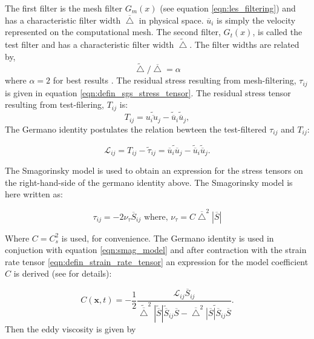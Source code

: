 The first filter is the mesh filter $G_m(x)$ (see equation \eqref{eqn:les_filtering}) and has a
characteristic filter width $\overline \bigtriangleup$ in physical space. $\overline{u}_i$ is simply
the velocity represented on the computational mesh. The second filter, $G_t(x)$, is called the test filter
and has a characteristic filter width $\widetilde \bigtriangleup$.
The filter widths are related by,
\begin{equation}
\widetilde \bigtriangleup/\overline \bigtriangleup = \alpha
\label{eqn:les_filter_ratio}
\end{equation}
where $\alpha=2$ for best results \citep{germano1991}. The residual stress resulting from mesh-filtering,
$\tau_{ij}$ is given in equation \eqref{eqn:defin_sgs_stress_tensor}. The residual stress tensor resulting
from test-filering, $T_{ij}$ is:
\begin{equation}\label{testtau}
T_{ij} = \widetilde{\overline{u_i u_j}} - \widetilde{\overline u}_i \widetilde{\overline u}_j,
\end{equation}
The Germano identity postulates the relation bewteen the test-filtered $\tau_{ij}$ and $T_{ij}$:

\begin{equation}\label{leonard}
\mathcal L_{ij} = T_{ij} - \widetilde{\tau}_{ij} = \widetilde{\overline u_i \overline u_j} - \widetilde{\overline u}_i \widetilde{\overline u}_j.
\end{equation}

The Smagorinsky model is used to obtain an expression for the stress tensors on the right-hand-side of
the germano identity above. The Smagorinsky model is here written as:

\begin{equation}\label{eqn:smag_model}
\tau_{ij} = -2 \nu_\tau \overline S_{ij} \text{\ \ where,\ \ } \nu_\tau = C \overline \bigtriangleup^2 \left | \overline S \right |
\end{equation}

Where $C=C_s^2$ is used, for convenience. The Germano identity is used in conjuction with equation
\eqref{eqn:smag_model} and after contraction with the strain rate tensor \eqref{eqn:defin_strain_rate_tensor} 
an expression for the model coefficient $C$ is derived (see \cite{germano1991,germano1992} for details):

\begin{equation}\label{germanocoeff}
C(\mathbf x, t) = - \frac{1}{2} \frac{\mathcal L_{ij} \overline S_{ij}}
{\widetilde{\overline \bigtriangleup}^2 | \widetilde{\overline S} | \widetilde{\overline S}_{ij} \overline S -
\overline \bigtriangleup^2 \widetilde{ | \overline S | \overline S_{ij}} \overline S}.
\end{equation}
Then the eddy viscosity is given by

